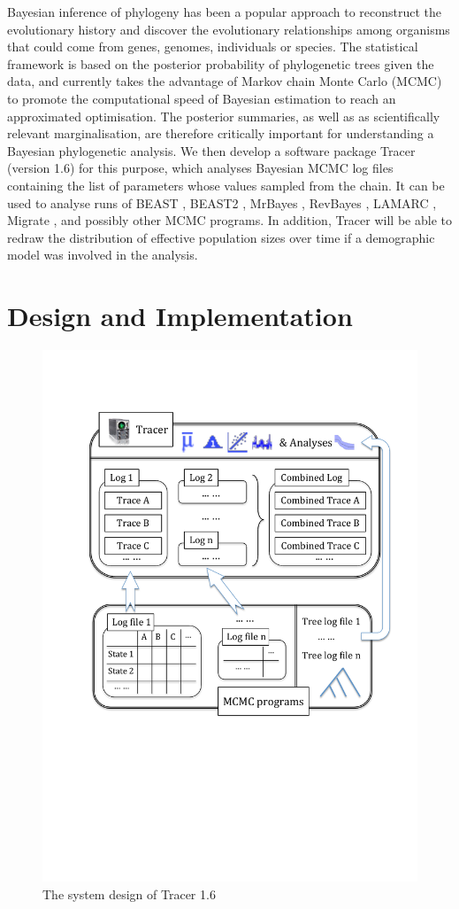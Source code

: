 \documentclass{bioinfo}
\begin{document}
Bayesian inference of phylogeny \citep{huelsenbeck2001bayesian, felsenstein2004inferring,yang2006computational} has been a popular approach to reconstruct the evolutionary history and discover the evolutionary relationships among organisms that could come from genes, genomes, individuals or species.
The statistical framework is based on the posterior probability of phylogenetic trees given the data, and currently takes the advantage of Markov chain Monte Carlo (MCMC) to promote the computational speed of Bayesian estimation to reach an approximated optimisation.
The posterior summaries, as well as as scientifically relevant marginalisation, %
are therefore critically important for understanding a Bayesian phylogenetic analysis.
We then develop a software package Tracer (version 1.6) for this purpose, which analyses Bayesian MCMC log files containing the list of parameters whose values sampled from the chain. 
It can be used to analyse runs of BEAST \citep{drummond2007beast,drummond2012bayesian}, BEAST2 \citep{bouckaert2014beast2}, MrBayes \citep{ronquist2012mrbayes}, RevBayes \citep{hohna2016revbayes}, LAMARC \citep{kuhner2006lamarc}, Migrate \citep{beerli2006comparison},  and possibly other MCMC programs.
In addition, Tracer will be able to redraw the distribution of effective population sizes over time if a demographic model was involved in the analysis.



\section*{Design and Implementation}

\begin{figure}[ht]
\includegraphics[width=.38\textwidth]{./figures/tracer.pdf}  
\caption{The system design of Tracer 1.6}
\label{fig:tracer}
\end{figure}
\end{document}
